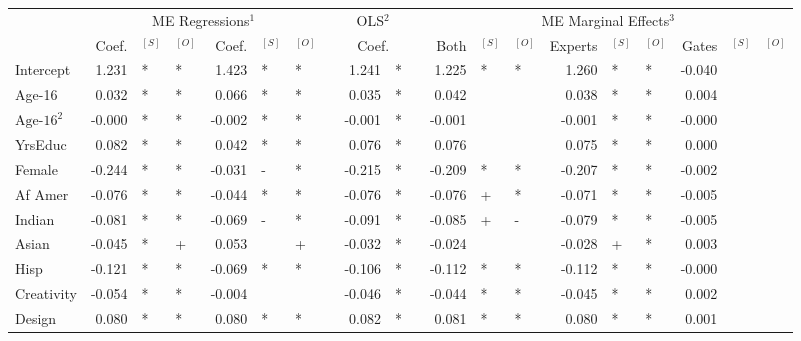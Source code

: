 \documentclass[12pt]{article}
\theoremstyle{definition}
\begin{document}
\begin{landscape}
\begin{table}
\begin{threeparttable}
\begin{tabular}[l]{l r l l r l l c r l c r l l r l l r l l}
  \hline
  & \multicolumn{6}{c}{ME Regressions$^{1}$} &&  \multicolumn{2}{c}{OLS$^{2}$} && \multicolumn{9}{c}{ME Marginal Effects$^{3}$} \\
  \cmidrule(l){2-7}    \cmidrule(l){9-10}     \cmidrule(l){12-20}
  & Coef.  & $^{[S]}$ & $^{[O]}$ &  Coef. & $^{[S]}$ & $^{[O]}$  && \multicolumn{2}{c}{Coef.} && Both   & $^{[S]}$ & $^{[O]}$ & Experts & $^{[S]}$ & $^{[O]}$ & Gates  & $^{[S]}$ & $^{[O]}$ \\
                  \cmidrule(l){2-4} \cmidrule(l){5-7} \cmidrule(l){9-10} \cmidrule(l){12-14} \cmidrule(l){15-17} \cmidrule(l){18-20}
  Intercept              &  1.231 & *   & *   &  1.423 & *   & *    &&  1.241 & *     &&  1.225 & *   & *    &  1.260  & *   & *   & -0.040 &     &   \\
  Age-16                 &  0.032 & *   & *   &  0.066 & *   & *    &&  0.035 & *     &&  0.042 &     &      &  0.038  & *   & *   &  0.004 &     &   \\
  $\textrm{Age-16}^{2}$  & -0.000 & *   & *   & -0.002 & *   & *    && -0.001 & *     && -0.001 &     &      & -0.001  & *   & *   & -0.000 &     &   \\
  YrsEduc                &  0.082 & *   & *   &  0.042 & *   & *    &&  0.076 & *     &&  0.076 &     &      &  0.075  & *   & *   &  0.000 &     &   \\
  Female                 & -0.244 & *   & *   & -0.031 & -   & *    && -0.215 & *     && -0.209 & *   & *    & -0.207  & *   & *   & -0.002 &     &   \\
  Af Amer                & -0.076 & *   & *   & -0.044 & *   & *    && -0.076 & *     && -0.076 & +   & *    & -0.071  & *   & *   & -0.005 &     &   \\
  Indian                 & -0.081 & *   & *   & -0.069 & -   & *    && -0.091 & *     && -0.085 & +   & -    & -0.079  & *   & *   & -0.005 &     &   \\
  Asian                  & -0.045 & *   & +   &  0.053 &     & +    && -0.032 & *     && -0.024 &     &      & -0.028  & +   & *   &  0.003 &     &   \\
  Hisp                   & -0.121 & *   & *   & -0.069 & *   & *    && -0.106 & *     && -0.112 & *   & *    & -0.112  & *   & *   & -0.000 &     &   \\
  Creativity             & -0.054 & *   & *   & -0.004 &     &      && -0.046 & *     && -0.044 & *   & *    & -0.045  & *   & *   &  0.002 &     &   \\
  Design                 &  0.080 & *   & *   &  0.080 & *   & *    &&  0.082 & *     &&  0.081 & *   & *    &  0.080  & *   & *   &  0.001 &     &   \\

\end{tabular}
\end{threeparttable}
\end{table}
\end{landscape}
\end{document}
